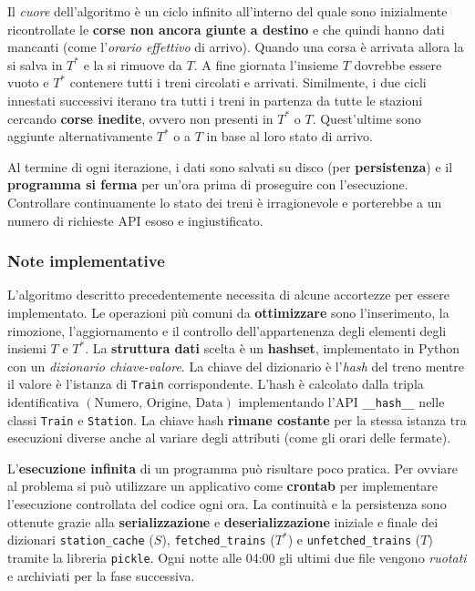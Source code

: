 \documentclass[12pt,italian]{report}
\begin{document}
Il \textit{cuore} dell'algoritmo è un ciclo infinito all'interno del
quale sono inizialmente ricontrollate le \textbf{corse non ancora
    giunte a destino} e che quindi hanno dati mancanti (come
l'\textit{orario effettivo} di arrivo).  Quando una corsa è arrivata
allora la si salva in $T^*$ e la si rimuove da $T$.  A fine giornata
l'insieme $T$ dovrebbe essere vuoto e $T^*$ contenere tutti i treni
circolati e arrivati.  Similmente, i due cicli innestati successivi
iterano tra tutti i treni in partenza da tutte le stazioni cercando
\textbf{corse inedite}, ovvero non presenti in $T^*$ o $T$.
Quest'ultime sono aggiunte alternativamente $T^*$ o a $T$ in base al
loro stato di arrivo.

Al termine di ogni iterazione, i dati sono salvati su disco (per
\textbf{persistenza}) e il \textbf{programma si ferma} per un'ora
prima di proseguire con l'esecuzione.  Controllare continuamente lo
stato dei treni è irragionevole e porterebbe a un numero di richieste
API esoso e ingiustificato.

\subsubsection{Note implementative}

L'algoritmo descritto precedentemente necessita di alcune accortezze
per essere implementato.  Le operazioni più comuni da
\textbf{ottimizzare} sono l'inserimento, la rimozione, l'aggiornamento
e il controllo dell'appartenenza degli elementi degli insiemi $T$ e
$T^*$.  La \textbf{struttura dati} scelta è un \textbf{hashset},
implementato in Python con un \textit{dizionario chiave-valore}.  La
chiave del dizionario è l'\textit{hash} del treno mentre il valore è
l'istanza di \texttt{Train} corrispondente.  L'hash è calcolato dalla
tripla identificativa
$(\textrm{Numero}, \, \textrm{Origine}, \, \textrm{Data})$
implementando l'API \texttt{\_\_hash\_\_} nelle classi \texttt{Train}
e \texttt{Station}.  La chiave hash \textbf{rimane costante} per la
stessa istanza tra esecuzioni diverse anche al variare degli attributi
(come gli orari delle fermate).

L'\textbf{esecuzione infinita} di un programma può risultare poco
pratica.  Per ovviare al problema si può utilizzare un applicativo
come \textbf{crontab} per implementare l'esecuzione controllata del
codice ogni ora.  La continuità e la persistenza sono ottenute grazie
alla \textbf{serializzazione} e \textbf{deserializzazione} iniziale e
finale dei dizionari \texttt{station\_cache} ($S$),
\texttt{fetched\_trains} ($T^*$) e \texttt{unfetched\_trains} ($T$)
tramite la libreria \texttt{pickle}.  Ogni notte alle 04:00 gli ultimi
due file vengono \textit{ruotati} e archiviati per la fase successiva.
\end{document}
